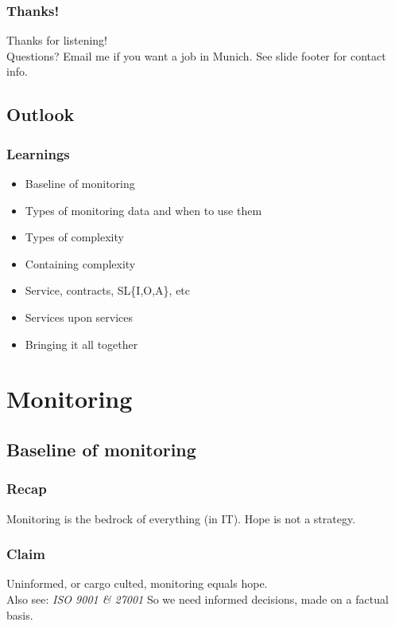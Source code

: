 \documentclass[aspectratio=169]{beamer}
\begin{document}
\begin{frame}
	\frametitle{Thanks!}
	\begin{center}
		\vfill
		Thanks for listening!\\
		\vfill
		Questions?
		\vfill
		Email me if you want a job in Munich.
		\vfill
		See slide footer for contact info.
		\vfill
	\end{center}
\end{frame}


\subsection{Outlook}

\begin{frame}
	\frametitle{Learnings}
	\vfill
	\begin{itemize}

		\item Baseline of monitoring
		\item Types of monitoring data and when to use them

		\item Types of complexity
		\item Containing complexity

		\item Service, contracts, SL\{I,O,A\}, etc
		\item Services upon services

		\item Bringing it all together
	\end{itemize}
	\vfill
\end{frame}



\section{Monitoring}


\subsection{Baseline of monitoring}

\begin{frame}
	\frametitle{Recap}
	\begin{center}
		\vfill
		Monitoring is the bedrock of everything (in IT).
		\vfill
		Hope is not a strategy.
		\vfill
	\end{center}
\end{frame}

\begin{frame}
	\frametitle{Claim}
	\begin{center}
		\vfill
		Uninformed, or cargo culted, monitoring equals hope.\\
		Also see: \textit{ISO 9001 \& 27001}
		\vfill
		So we need informed decisions, made on a factual basis.
		\vfill
	\end{center}
\end{frame}
\end{document}
